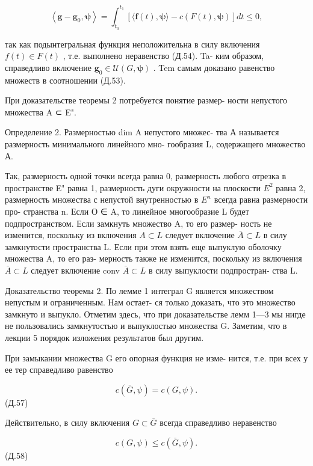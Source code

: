 \documentclass[8pt]{extarticle}
\begin{document}
\[
\left\langle  {\mathbf{g} - {\mathbf{g}}_{0},\mathbf{\psi }}\right\rangle   = {\int }_{{t}_{0}}^{{t}_{1}}\left\lbrack  {\langle \mathbf{f}\left( t\right) ,\mathbf{\psi }\rangle  - c\left( {F\left( t\right) ,\mathbf{\psi }}\right) }\right\rbrack  {dt} \leq  0,
\]

так как подынтегральная функция неположительна в силу включения \(f\left( t\right)  \in  F\left( t\right)\) , т.е. выполнено неравенство (Д.54). Ta- ким образом, справедливо включение \({\mathbf{g}}_{0} \in  \mathcal{U}\left( {G,\mathbf{\psi }}\right)\) . Tem самым доказано равенство множеств в соотношении (Д.53).

При доказательстве теоремы 2 потребуется понятие размер- ности непустого множества A ⊂ E".

Определение 2. Размерностью dim A непустого множес- тва А называется размерность минимального линейного мно- гообразия L, содержащего множество А.

Так, размерность одной точки всегда равна 0, размерность любого отрезка в пространстве E" равна 1, размерность дуги окружности на плоскости \({E}^{2}\) равна 2, размерность множества с непустой внутренностью в \(E^n\) всегда равна размерности про- странства n. Если О ∈ A, то линейное многообразие L будет подпространством. Если замкнуть множество A, то его размер- ность не изменится, поскольку из включения \(A \subset  L\) следует включение \(\bar{A} \subset  L\) в силу замкнутости пространства L. Если при этом взять еще выпуклую оболочку множества A, то его раз- мерность также не изменится, поскольку из включения \(\bar{A} \subset  L\) следует включение conv \(\bar{A} \subset  L\) в силу выпуклости подпростран- ства L.

Доказательство теоремы 2. По лемме 1 интеграл G является множеством непустым и ограниченным. Нам остает- ся только доказать, что это множество замкнуто и выпукло. Отметим здесь, что при доказательстве лемм 1—3 мы нигде не пользовались замкнутостью и выпуклостью множества G. Заметим, что в лекции 5 порядок изложения результатов был другим.

При замыкании множества G его опорная функция не изме- нится, т.е. при всех у ее тер справедливо равенство

\[
c\left( {\bar{G},\psi }\right)  = c\left( {G,\psi }\right) .
\]
 (Д.57)

Действительно, в силу включения \(G \subset  \bar{G}\) всегда справедливо неравенство

\[
c\left( {G,\psi }\right)  \leq  c\left( {\bar{G},\psi }\right) .
\]
 (Д.58)
\end{document}
